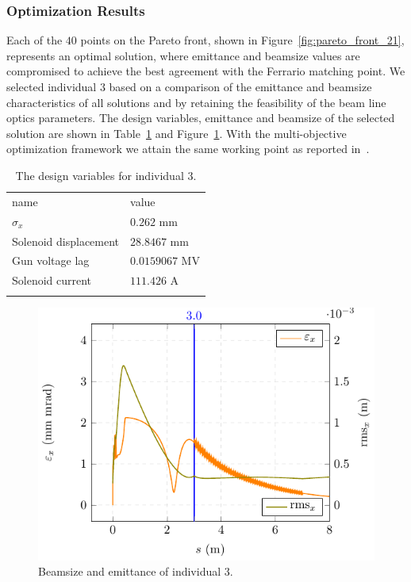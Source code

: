 \subsubsection{Optimization Results}

Each of the $40$ points on the Pareto front, shown in
  Figure~\ref{fig:pareto_front_21}, represents an optimal solution, where
  emittance and beamsize values are compromised to achieve the best agreement
  with the Ferrario matching point.
We selected individual $3$ based on a comparison of the emittance and beamsize
  characteristics of all solutions and by retaining the feasibility of the
  beam line optics parameters.
The design variables, emittance and beamsize of the selected solution are
  shown in Table~\ref{tbl:des_vars} and Figure~\ref{fig:rmsemit}.
With the multi-objective optimization framework we attain the same working
  point as reported in~\cite{pedr:10}.

\begin{table}
  \begin{center}
    \caption{The design variables for individual $3$.}
    \label{tbl:des_vars}
    \begin{tabular}{ll}
      \hline\noalign{\smallskip}
      name & value \\
      \noalign{\smallskip}\hline\noalign{\smallskip}
        $\sigma_{x}$          & $0.262$ mm \\
        Solenoid displacement & $28.8467$ mm \\
        Gun voltage lag       & $0.0159067$ MV\\
        Solenoid current      & $111.426$ A \\
      \noalign{\smallskip}\hline
    \end{tabular}
  \end{center}
\end{table}

\begin{figure}[h!]
  \centering
  \includegraphics[width=0.8\linewidth]{Report/iff_plot_emrms}
  \caption{Beamsize and emittance of individual $3$.}
  \label{fig:rmsemit}
\end{figure}

